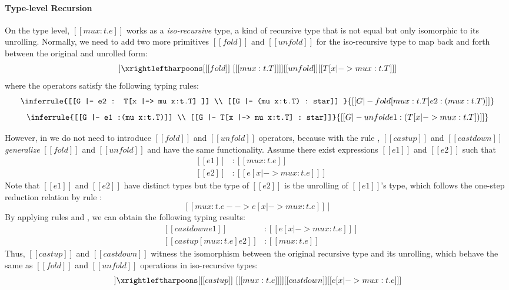 \paragraph{Type-level Recursion}

On the type level, $[[mu x:t.e]]$ works as a \emph{iso-recursive}
type, a kind of recursive type that is not equal but only isomorphic
to its unrolling. Normally, we need to add two more primitives
$[[fold]]$ and $[[unfold]]$ for the iso-recursive type to map back
and forth between the original and unrolled form:
\begin{align*}
  [[mu x:t.T]] \xrightleftharpoons[{[[fold]]~[ [[mu x:t.T]] ]}]
  {[[unfold]]} [[T[x |-> mu x:t.T] ]]
\end{align*}
where the operators satisfy the following typing rules:
\[ \inferrule{[[G |- e2 : T[x |-> mu x:t.T] ]] \\ [[G |- (mu x:t.T) : star]] }
   {[[G |- fold [mu x:t.T] e2 : (mu x:t.T) ]]} \]
\[ \inferrule{[[G |- e1 :(mu x:t.T)]] \\ [[G |- T[x |-> mu x:t.T] : star]]}
   {[[G |- unfold e1 : (T[x |-> mu x:t.T]) ]]} \]

However, in \name we do not need to introduce $[[fold]]$ and
$[[unfold]]$ operators, because with the rule ,
$[[castup]]$ and $[[castdown]]$ \emph{generalize} $[[fold]]$ and
$[[unfold]]$ and have the same functionality. Assume there exist
expressions $[[e1]]$ and $[[e2]]$ such that
\[\begin{array}{lll}
	&[[e1]] &: [[mu x:t.e]]\\
	&[[e2]] &: [[e [x |-> mu x:t.e] ]]
\end{array}\]
Note that $[[e1]]$ and $[[e2]]$ have distinct types but the type of
$[[e2]]$ is the unrolling of $[[e1]]$'s type, which follows the
one-step reduction relation by rule :
\[ [[mu x:t.e --> e [x |-> mu x:t.e] ]] \]
By applying rules  and , we
can obtain the following typing results:
\[\begin{array}{lll}
	&[[castdown e1]] &: [[e [x |-> mu x:t.e] ]]\\
	&[[castup [mu x:t.e] e2]] &: [[mu x:t.e]]
\end{array}\]
Thus, $[[castup]]$ and $[[castdown]]$ witness the isomorphism between
the original recursive type and its unrolling, which behave the same
as $[[fold]]$ and $[[unfold]]$ operations in iso-recursive types:
\begin{align*}
  [[mu x:t.e]] \xrightleftharpoons[{[[castup]]~[ [[mu x:t.e]]
  ]}]{[[castdown]]} [[e[x |-> mu x:t.e] ]]
\end{align*}


